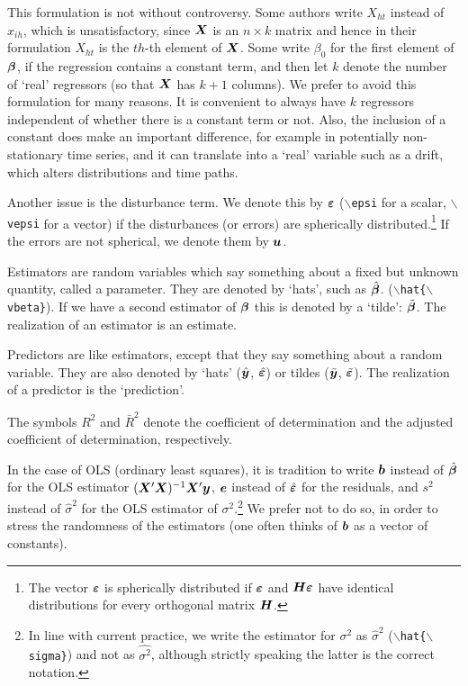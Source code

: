\documentclass[11pt,dvips,a4paper]{article}
\newcommand{\type}[1]{{\tt$\backslash$#1}}
\begin{document}
This formulation is not without controversy.
Some authors write
$X_{ht}$ instead of $x_{ih}$, which is unsatisfactory, since $\bm X$ is an
$n\times k$ matrix and hence in their formulation $X_{ht}$ is the $th$-th
element of $\bm X$.
Some write $\beta_0$ for the first element of $\bm \beta$, if the
regression contains a constant term, and then let $k$ denote the number
of `real' regressors (so that $\bm X$ has $k+1$ columns).
We prefer to avoid this formulation for many reasons. It is
convenient to always have $k$ regressors independent of whether there
is a constant term or not. Also, the inclusion of a constant
does make an important difference, for example in potentially
non-stationary time series, and it can translate into a `real' variable
such as a drift, which alters distributions and time paths.

Another issue is the disturbance term. We denote this by $\bm {\varepsilon}$
(\type{epsi} for a scalar, \type{vepsi} for a vector)
if the disturbances (or errors) are spherically distributed.\footnote{The
vector $\bm {\varepsilon}$ is spherically distributed if $\bm {\varepsilon}$
and $\bm H\bm {\varepsilon}$ have identical distributions for every orthogonal
matrix $\bm H$.}
If the errors are not spherical, we denote them by $\bm u$.

Estimators are random variables which say something about a fixed but unknown
quantity, called a parameter.
They are denoted by `hats', such as $\hat{\bm \beta}$.
(\type{hat\{$\backslash$vbeta\}}).
If we have a second estimator of $\bm \beta$ this is denoted by a `tilde':
$\tilde{\bm \beta}$. The realization of an estimator is an estimate.

Predictors are like estimators, except that they say something about a random variable.
They are also denoted by `hats' ($\hat{\bm y}$, $\hat{\bm {\varepsilon}}$)
or tildes ($\tilde{\bm y}$, $\tilde{\bm {\varepsilon}}$).
The realization of a predictor is the `prediction'.

The symbols
$R^2$ and $\bar{R}^2$ denote the coefficient of determination
and the adjusted coefficient of determination, respectively.

In the case of OLS (ordinary least squares), it is tradition to write
$\bm b$ instead of $\hat{\bm \beta}$ for the OLS estimator $(\bm X'\bm X)^{-1}\bm X'\bm y$,
$\bm e$ instead of $\hat{\bm {\varepsilon}}$ for the residuals,
and $s^2$ instead of $\hat{\sigma}^2$ for the OLS estimator of
$\sigma^2$.\footnote{In line with current practice, we write the estimator for
$\sigma^2$ as $\hat{\sigma}^2$
(\type{hat\{$\backslash$sigma\}})
and not as $\hat{\sigma^2}$, although strictly speaking
the latter is the correct notation.}
We prefer not to do so, in order to stress the randomness of the estimators
(one often thinks of $\bm b$ as a vector of constants).
\end{document}
